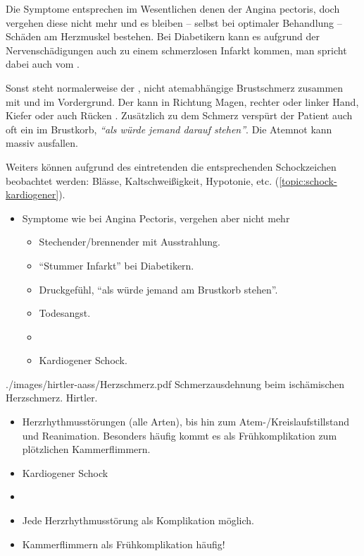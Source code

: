 {%
Die Symptome entsprechen im Wesentlichen denen der Angina pectoris, doch
vergehen diese nicht mehr und es bleiben -- selbst bei optimaler Behandlung --
Schäden am Herzmuskel bestehen. Bei Diabetikern kann es aufgrund der
Nervenschädigungen auch zu einem schmerzlosen Infarkt kommen, man
spricht dabei auch vom .

Sonst steht normalerweise der , nicht atemabhängige
Brustschmerz zusammen mit  und  im Vordergrund. Der
 kann in Richtung Magen, rechter oder linker Hand, Kiefer
oder auch Rücken . Zusätzlich zu dem
Schmerz verspürt der Patient auch oft ein  im
Brustkorb, \emph{"`als würde jemand darauf stehen"'}. Die
Atemnot kann massiv ausfallen. 

Weiters können aufgrund des eintretenden  die entsprechenden Schockzeichen beobachtet
werden: Blässe, Kaltschweißigkeit, Hypotonie, etc.
(\ref{topic:schock-kardiogener}).
}{
\begin{itemize}
  \item Symptome wie bei Angina Pectoris, vergehen aber nicht
  mehr
  \begin{itemize}
    \item Stechender/brennender  mit Ausstrahlung.
    \item "`Stummer Infarkt"' bei Diabetikern.
    \item Druckgefühl, "`als würde jemand am
    Brustkorb stehen"'.
    \item Todesangst.
    \item {}
    \item Kardiogener Schock.
  \end{itemize}
\end{itemize}
}
{./images/hirtler-aass/Herzschmerz.pdf}
{Schmerzausdehnung beim ischämischen
Herzschmerz.}
{Hirtler.}
  
{%
\begin{itemize}
  \item Herzrhythmusstörungen (alle Arten), bis hin
  zum Atem-/Kreislaufstillstand und Reanimation.
  Besonders häufig kommt es als Frühkomplikation zum
  plötzlichen Kammerflimmern.
  \item Kardiogener Schock 
\end{itemize}

}{
\begin{itemize}
  \item {}
  \item Jede Herzrhythmusstörung als Komplikation möglich.
  \item Kammerflimmern als Frühkomplikation häufig!
\end{itemize}

}{}{}{}

